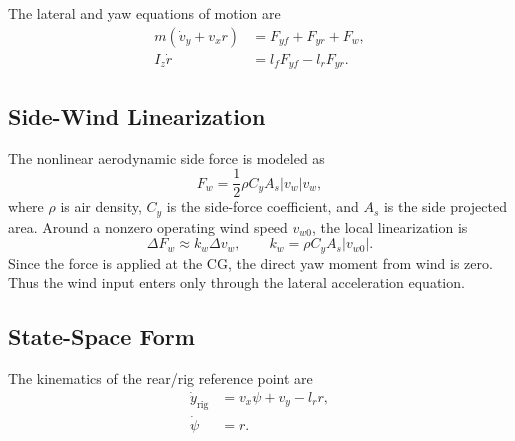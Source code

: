 \documentclass[10pt,twocolumn]{article}
\begin{document}
The lateral and yaw equations of motion are
\begin{align}
    m\left(\dot{v}_y + v_x r\right) &=
    F_{yf} + F_{yr} + F_w, \label{eq:lateral_eom}\\
    I_z \dot{r} &=
    l_f F_{yf} - l_r F_{yr}. \label{eq:yaw_eom}
\end{align}

\subsection{Side-Wind Linearization}

The nonlinear aerodynamic side force is modeled as
\begin{equation}
    F_w =
    \frac{1}{2}\rho C_y A_s |v_w|v_w ,
\end{equation}
where $\rho$ is air density, $C_y$ is the side-force coefficient, and $A_s$ is
the side projected area. Around a nonzero operating wind speed
$v_{w0}$, the local linearization is
\begin{equation}
    \Delta F_w
    \approx
    k_w \Delta v_w,
    \qquad
    k_w =
    \rho C_y A_s |v_{w0}|.
\end{equation}
Since the force is applied at the CG, the direct yaw moment from wind is zero.
Thus the wind input enters only through the lateral acceleration equation.

\subsection{State-Space Form}

The kinematics of the rear/rig reference point are
\begin{align}
    \dot{y}_{\mathrm{rig}} &=
    v_x \psi + v_y - l_r r, \label{eq:y_kinematics}\\
    \dot{\psi} &= r. \label{eq:yaw_kinematics}
\end{align}
\end{document}

